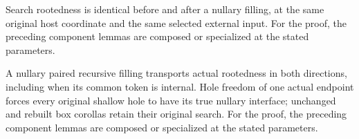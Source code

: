Search rootedness is identical before and after a nullary filling, at the same original host coordinate and the same selected external input.
For the proof, the preceding component lemmas are composed or specialized at the stated parameters.
\par{}

A nullary paired recursive filling transports actual rootedness in both directions, including when its common token is internal. Hole freedom of one actual endpoint forces every original shallow hole to have its true nullary interface; unchanged and rebuilt box corollas retain their original search.
For the proof, the preceding component lemmas are composed or specialized at the stated parameters.
\par{}

